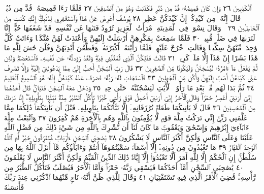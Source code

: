 ٱلْكَٰذِبِينَ ٢٦ وَإِن كَانَ قَمِيصُهُۥ قُدَّ مِن دُبُرࣲ فَكَذَبَتْ وَهُوَ
مِنَ ٱلصَّٰدِقِينَ ٢٧ فَلَمَّا رَءَا قَمِيصَهُۥ قُدَّ مِن دُبُرࣲ قَالَ إِنَّهُۥ
مِن كَيْدِكُنَّۖ إِنَّ كَيْدَكُنَّ عَظِيمࣱ ٢٨ يُوسُفُ أَعْرِضْ عَنْ
هَٰذَاۚ وَٱسْتَغْفِرِي لِذَنۢبِكِۖ إِنَّكِ كُنتِ مِنَ ٱلْخَاطِـِٔينَ ٢٩
۞ وَقَالَ نِسْوَةࣱ فِي ٱلْمَدِينَةِ ٱمْرَأَتُ ٱلْعَزِيزِ تُرَٰوِدُ فَتَىٰهَا
عَن نَّفْسِهِۦۖ قَدْ شَغَفَهَا حُبًّاۖ إِنَّا لَنَرَىٰهَا فِي ضَلَٰلࣲ مُّبِينࣲ ٣٠
فَلَمَّا سَمِعَتْ بِمَكْرِهِنَّ أَرْسَلَتْ إِلَيْهِنَّ وَأَعْتَدَتْ لَهُنَّ مُتَّكَـࣰٔا
وَءَاتَتْ كُلَّ وَٰحِدَةࣲ مِّنْهُنَّ سِكِّينࣰا وَقَالَتِ ٱخْرُجْ عَلَيْهِنَّۖ فَلَمَّا رَأَيْنَهُۥٓ
أَكْبَرْنَهُۥ وَقَطَّعْنَ أَيْدِيَهُنَّ وَقُلْنَ حَٰشَ لِلَّهِ مَا هَٰذَا بَشَرًا إِنْ هَٰذَآ
إِلَّا مَلَكࣱ كَرِيمࣱ ٣١ قَالَتْ فَذَٰلِكُنَّ ٱلَّذِي لُمْتُنَّنِي فِيهِۖ وَلَقَدْ رَٰوَدتُّهُۥ
عَن نَّفْسِهِۦ فَٱسْتَعْصَمَۖ وَلَئِن لَّمْ يَفْعَلْ مَآ ءَامُرُهُۥ لَيُسْجَنَنَّ
وَلَيَكُونࣰا مِّنَ ٱلصَّٰغِرِينَ ٣٢ قَالَ رَبِّ ٱلسِّجْنُ أَحَبُّ إِلَيَّ مِمَّا يَدْعُونَنِيٓ
إِلَيْهِۖ وَإِلَّا تَصْرِفْ عَنِّي كَيْدَهُنَّ أَصْبُ إِلَيْهِنَّ وَأَكُن مِّنَ ٱلْجَٰهِلِينَ ٣٣
فَٱسْتَجَابَ لَهُۥ رَبُّهُۥ فَصَرَفَ عَنْهُ كَيْدَهُنَّۚ إِنَّهُۥ هُوَ ٱلسَّمِيعُ
ٱلْعَلِيمُ ٣٤ ثُمَّ بَدَا لَهُم مِّنۢ بَعْدِ مَا رَأَوُا۟ ٱلْأٓيَٰتِ لَيَسْجُنُنَّهُۥ
حَتَّىٰ حِينࣲ ٣٥ وَدَخَلَ مَعَهُ ٱلسِّجْنَ فَتَيَانِۖ قَالَ أَحَدُهُمَآ إِنِّيٓ
أَرَىٰنِيٓ أَعْصِرُ خَمْرࣰاۖ وَقَالَ ٱلْأٓخَرُ إِنِّيٓ أَرَىٰنِيٓ أَحْمِلُ فَوْقَ رَأْسِي
خُبْزࣰا تَأْكُلُ ٱلطَّيْرُ مِنْهُۖ نَبِّئْنَا بِتَأْوِيلِهِۦٓۖ إِنَّا نَرَىٰكَ مِنَ
ٱلْمُحْسِنِينَ ٣٦ قَالَ لَا يَأْتِيكُمَا طَعَامࣱ تُرْزَقَانِهِۦٓ إِلَّا نَبَّأْتُكُمَا
بِتَأْوِيلِهِۦ قَبْلَ أَن يَأْتِيَكُمَاۚ ذَٰلِكُمَا مِمَّا عَلَّمَنِي رَبِّيٓۚ إِنِّي تَرَكْتُ
مِلَّةَ قَوْمࣲ لَّا يُؤْمِنُونَ بِٱللَّهِ وَهُم بِٱلْأٓخِرَةِ هُمْ كَٰفِرُونَ ٣٧
وَٱتَّبَعْتُ مِلَّةَ ءَابَآءِيٓ إِبْرَٰهِيمَ وَإِسْحَٰقَ وَيَعْقُوبَۚ مَا كَانَ
لَنَآ أَن نُّشْرِكَ بِٱللَّهِ مِن شَيْءࣲۚ ذَٰلِكَ مِن فَضْلِ ٱللَّهِ عَلَيْنَا وَعَلَى
ٱلنَّاسِ وَلَٰكِنَّ أَكْثَرَ ٱلنَّاسِ لَا يَشْكُرُونَ ٣٨ يَٰصَٰحِبَيِ
ٱلسِّجْنِ ءَأَرْبَابࣱ مُّتَفَرِّقُونَ خَيْرٌ أَمِ ٱللَّهُ ٱلْوَٰحِدُ ٱلْقَهَّارُ ٣٩
مَا تَعْبُدُونَ مِن دُونِهِۦٓ إِلَّآ أَسْمَآءࣰ سَمَّيْتُمُوهَآ أَنتُمْ
وَءَابَآؤُكُم مَّآ أَنزَلَ ٱللَّهُ بِهَا مِن سُلْطَٰنٍۚ إِنِ ٱلْحُكْمُ إِلَّا لِلَّهِ
أَمَرَ أَلَّا تَعْبُدُوٓا۟ إِلَّآ إِيَّاهُۚ ذَٰلِكَ ٱلدِّينُ ٱلْقَيِّمُ وَلَٰكِنَّ أَكْثَرَ
ٱلنَّاسِ لَا يَعْلَمُونَ ٤٠ يَٰصَٰحِبَيِ ٱلسِّجْنِ أَمَّآ أَحَدُكُمَا
فَيَسْقِي رَبَّهُۥ خَمْرࣰاۖ وَأَمَّا ٱلْأٓخَرُ فَيُصْلَبُ فَتَأْكُلُ ٱلطَّيْرُ
مِن رَّأْسِهِۦۚ قُضِيَ ٱلْأَمْرُ ٱلَّذِي فِيهِ تَسْتَفْتِيَانِ ٤١ وَقَالَ
لِلَّذِي ظَنَّ أَنَّهُۥ نَاجࣲ مِّنْهُمَا ٱذْكُرْنِي عِندَ رَبِّكَ فَأَنسَىٰهُ
